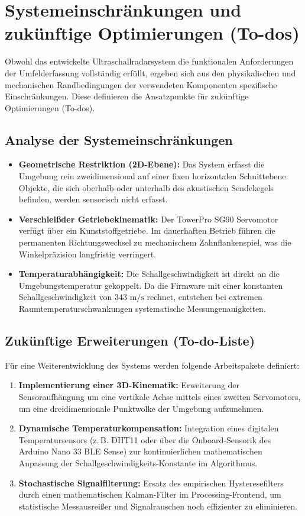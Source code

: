 %
%
%


\chapter{Systemeinschränkungen und zukünftige Optimierungen (To-dos)}
\label{chap:Constraints_ToDos}

Obwohl das entwickelte Ultraschallradarsystem die funktionalen Anforderungen der Umfelderfassung vollständig erfüllt, ergeben sich aus den physikalischen und mechanischen Randbedingungen der verwendeten Komponenten spezifische Einschränkungen. Diese definieren die Ansatzpunkte für zukünftige Optimierungen (To-dos).

\section{Analyse der Systemeinschränkungen}
\begin{itemize}
	\item \textbf{Geometrische Restriktion (2D-Ebene):} Das System erfasst die Umgebung rein zweidimensional auf einer fixen horizontalen Schnittebene. Objekte, die sich oberhalb oder unterhalb des akustischen Sendekegels befinden, werden sensorisch nicht erfasst.
	\item \textbf{Verschlei\ss der Getriebekinematik:} Der TowerPro SG90 Servomotor verfügt über ein Kunststoffgetriebe. Im dauerhaften Betrieb führen die permanenten Richtungswechsel zu mechanischem Zahnflankenspiel, was die Winkelpräzision langfristig verringert.
	\item \textbf{Temperaturabhängigkeit:} Die Schallgeschwindigkeit ist direkt an die Umgebungstemperatur gekoppelt. Da die Firmware mit einer konstanten Schallgeschwindigkeit von $343\text{ m/s}$ rechnet, entstehen bei extremen Raumtemperaturschwankungen systematische Messungenauigkeiten.
\end{itemize}

\section{Zukünftige Erweiterungen (To-do-Liste)}
Für eine Weiterentwicklung des Systems werden folgende Arbeitspakete definiert:
\begin{enumerate}
	\item \textbf{Implementierung einer 3D-Kinematik:} Erweiterung der Sensoraufhängung um eine vertikale Achse mittels eines zweiten Servomotors, um eine dreidimensionale Punktwolke der Umgebung aufzunehmen.
	\item \textbf{Dynamische Temperaturkompensation:} Integration eines digitalen Temperatursensors (z.\,B. DHT11 oder über die Onboard-Sensorik des Arduino Nano 33 BLE Sense) zur kontinuierlichen mathematischen Anpassung der Schallgeschwindigkeits-Konstante im Algorithmus.
	\item \textbf{Stochastische Signalfilterung:} Ersatz des empirischen Hysteresefilters durch einen mathematischen Kalman-Filter im Processing-Frontend, um statistische Messausrei\ss er und Signalrauschen noch effizienter zu eliminieren.
\end{enumerate}